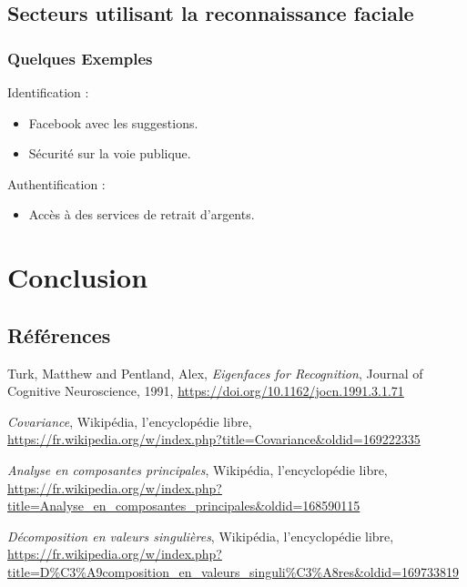 \documentclass{beamer}
\theoremstyle{plain}
\theoremstyle{definition}
\begin{document}
\subsection{Secteurs utilisant la reconnaissance faciale}
\begin{frame}
  \frametitle{Quelques Exemples}
  Identification :
  \begin{itemize}
  \item <2-> Facebook avec les suggestions.
  \item <4-> Sécurité sur la voie publique.
  \end{itemize}

  Authentification :
  \begin{itemize}
  \item <3-> Accès à des services de retrait d'argents.
  \end{itemize}  
\end{frame}



\section{Conclusion}
\subsection{Références}
\begin{frame}
  \begin{thebibliography}{1}
    Turk, Matthew and Pentland, Alex,
    \textit{Eigenfaces for Recognition},
    Journal of Cognitive Neuroscience,
    1991,
    \url{https://doi.org/10.1162/jocn.1991.3.1.71}

    \textit{Covariance},
    Wikipédia, l'encyclopédie libre,
    \url{https://fr.wikipedia.org/w/index.php?title=Covariance&oldid=169222335}

    \textit{Analyse en composantes principales},
    Wikipédia, l'encyclopédie libre,
    \url{https://fr.wikipedia.org/w/index.php?title=Analyse_en_composantes_principales&oldid=168590115}
    
    \textit{Décomposition en valeurs singulières},
    Wikipédia, l'encyclopédie libre,
    \url{https://fr.wikipedia.org/w/index.php?title=D\%C3\%A9composition_en_valeurs_singuli\%C3\%A8res&oldid=169733819}
  \end{thebibliography}
\end{frame}
\end{document}
